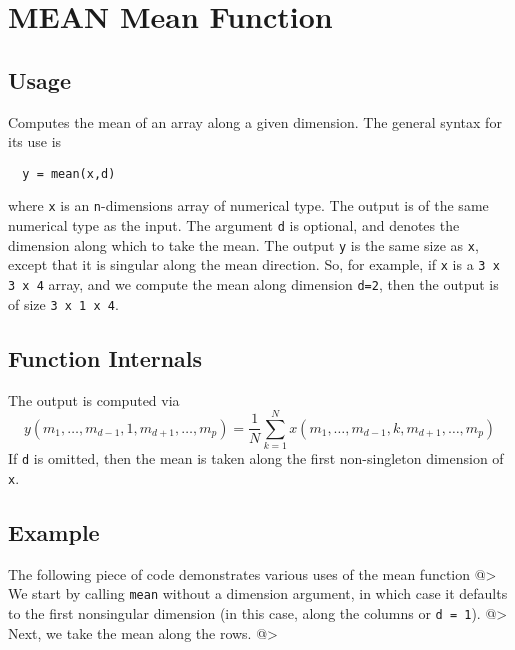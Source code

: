 \section{MEAN Mean Function}

\subsection{Usage}

Computes the mean of an array along a given dimension.  The general
syntax for its use is
\begin{verbatim}
  y = mean(x,d)
\end{verbatim}
where \verb|x| is an \verb|n|-dimensions array of numerical type.
The output is of the same numerical type as the input.  The argument
\verb|d| is optional, and denotes the dimension along which to take
the mean.  The output \verb|y| is the same size as \verb|x|, except
that it is singular along the mean direction.  So, for example,
if \verb|x| is a \verb|3 x 3 x 4| array, and we compute the mean along
dimension \verb|d=2|, then the output is of size \verb|3 x 1 x 4|.
\subsection{Function Internals}

The output is computed via
\[
y(m_1,\ldots,m_{d-1},1,m_{d+1},\ldots,m_{p}) = \frac{1}{N}
\sum_{k=1}^{N} x(m_1,\ldots,m_{d-1},k,m_{d+1},\ldots,m_{p})
\]
If \verb|d| is omitted, then the mean is taken along the 
first non-singleton dimension of \verb|x|. 
\subsection{Example}

The following piece of code demonstrates various uses of the mean
function
@>
We start by calling \verb|mean| without a dimension argument, in which 
case it defaults to the first nonsingular dimension (in this case, 
along the columns or \verb|d = 1|).
@>
Next, we take the mean along the rows.
@>
